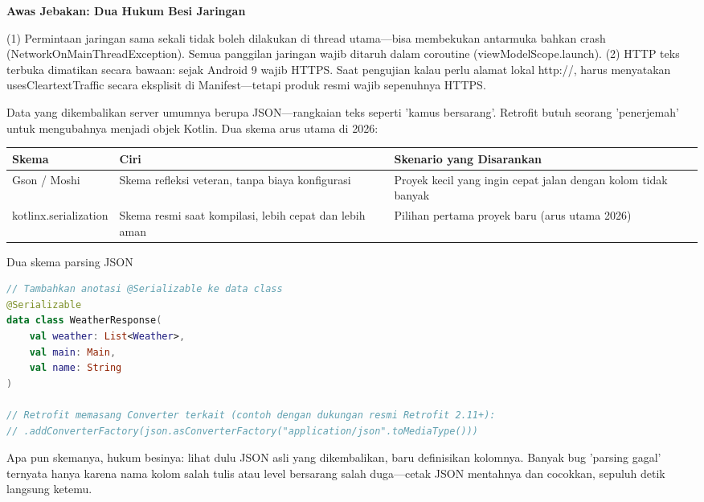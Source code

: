 \textbf{Awas Jebakan: Dua Hukum Besi Jaringan}\par

(1) Permintaan jaringan sama sekali tidak boleh dilakukan di thread utama—bisa membekukan antarmuka bahkan crash (NetworkOnMainThreadException). Semua panggilan jaringan wajib ditaruh dalam coroutine (viewModelScope.launch). (2) HTTP teks terbuka dimatikan secara bawaan: sejak Android 9 wajib HTTPS. Saat pengujian kalau perlu alamat lokal http://, harus menyatakan usesCleartextTraffic secara eksplisit di Manifest—tetapi produk resmi wajib sepenuhnya HTTPS.


Data yang dikembalikan server umumnya berupa JSON—rangkaian teks seperti 'kamus bersarang'. Retrofit butuh seorang 'penerjemah' untuk mengubahnya menjadi objek Kotlin. Dua skema arus utama di 2026:

\begin{center}
\begin{tabularx}{\linewidth}{|X|X|X|}
\hline
\textbf{Skema} & \textbf{Ciri} & \textbf{Skenario yang Disarankan} \tabularnewline
\hline
Gson / Moshi & Skema refleksi veteran, tanpa biaya konfigurasi & Proyek kecil yang ingin cepat jalan dengan kolom tidak banyak \tabularnewline
kotlinx.serialization & Skema resmi saat kompilasi, lebih cepat dan lebih aman & Pilihan pertama proyek baru (arus utama 2026) \tabularnewline
\hline
\end{tabularx}
\end{center}

\begin{center}\small\color{gray}Dua skema parsing JSON\end{center}

\begin{lstlisting}[language=Kotlin]
// Tambahkan anotasi @Serializable ke data class
@Serializable
data class WeatherResponse(
    val weather: List<Weather>,
    val main: Main,
    val name: String
)

// Retrofit memasang Converter terkait (contoh dengan dukungan resmi Retrofit 2.11+):
// .addConverterFactory(json.asConverterFactory("application/json".toMediaType()))
\end{lstlisting}

Apa pun skemanya, hukum besinya: lihat dulu JSON asli yang dikembalikan, baru definisikan kolomnya. Banyak bug 'parsing gagal' ternyata hanya karena nama kolom salah tulis atau level bersarang salah duga—cetak JSON mentahnya dan cocokkan, sepuluh detik langsung ketemu.

